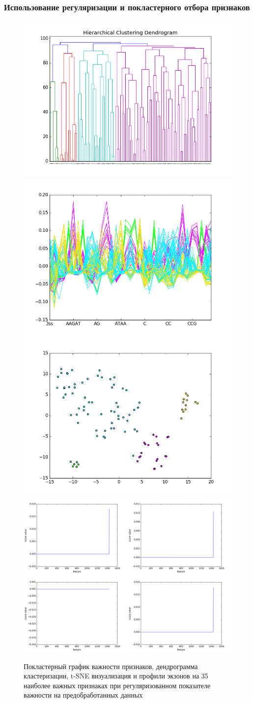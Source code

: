 \subsubsection{Использование регуляризации и покластерного отбора признаков}


\begin{figure}[H]
	\includegraphics[width=0.5\linewidth]{pics/dendrograms/ndfs_norm_cosine_1c.png} 
	\includegraphics[width=0.5\linewidth]{pics/profiles/ndfs_norm_cosine_1c.png}
	\includegraphics[width=0.5\linewidth]{pics/tsne/ndfs_norm_cosine_1c.png} \\
	\includegraphics[width=0.8\linewidth]{pics/graphs/ndfs_norm_cosine.png}
	\caption{Покластерный график важности признаков, дендрограмма кластеризации, t-SNE визуализация и профили экзонов на 35 наиболее важных признаках при регуляризованном показателе важности на предобработанных данных}
	\label{ndfs_norm_cosine}
\end{figure}



